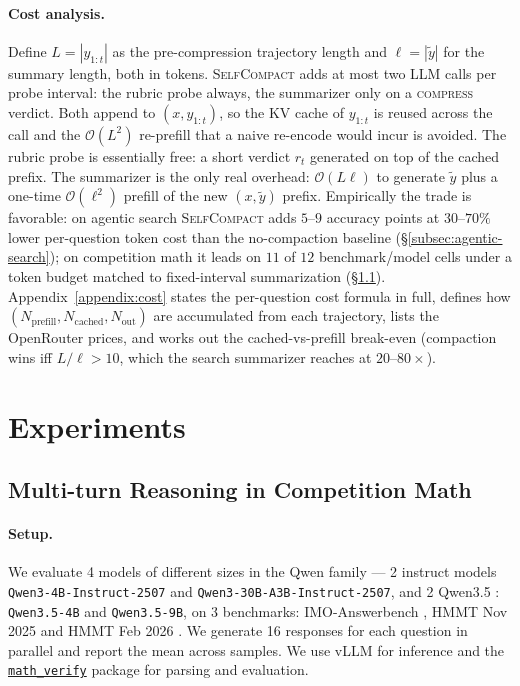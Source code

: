 \documentclass{article}
\newcommand{\jack}[1]{{\color{green}[JZ: #1]}}
\newcommand{\method}{\textsc{{SelfCompact}}}
\begin{document}
\paragraph{Cost analysis.} Define $L = |y_{1:t}|$ as the pre-compression
trajectory length and $\ell = |\tilde{y}|$ for the summary length, both in
tokens. \method{} adds at most two LLM calls per probe interval: the rubric
probe always, the summarizer only on a \textsc{compress} verdict. 
Both append to $(x, y_{1:t})$, so the KV cache of $y_{1:t}$ is reused
across the call and the $\mathcal{O}(L^2)$ re-prefill that a naive
re-encode would incur is avoided. The rubric probe is essentially free: a
short verdict $r_t$ generated on top of the cached prefix. The summarizer
is the only real overhead: $\mathcal{O}(L\ell)$ to generate $\tilde{y}$
plus a one-time $\mathcal{O}(\ell^2)$ prefill of the new $(x, \tilde{y})$
prefix. Empirically the trade is favorable: on agentic search
\method{} adds $5$--$9$ accuracy points at $30$--$70\%$ lower per-question
token cost than the no-compaction baseline (\S\ref{subsec:agentic-search});
on competition math it leads on $11$ of $12$ benchmark/model cells under a
token budget matched to fixed-interval summarization
(\S\ref{subsec:multi-turn-math}). Appendix~\ref{appendix:cost} states
the per-question cost formula in full, defines how
$(N_{\text{prefill}}, N_{\text{cached}}, N_{\text{out}})$ are
accumulated from each trajectory, lists the OpenRouter prices, and
works out the cached-vs-prefill break-even (compaction wins iff $L/\ell
> 10$, which the search summarizer reaches at $20$--$80\times$).

\section{Experiments}

\subsection{Multi-turn Reasoning in Competition Math}
\label{subsec:multi-turn-math}


\paragraph{Setup.} We evaluate 4 models of different sizes in the Qwen family --- 2 instruct models \texttt{Qwen3-4B-Instruct-2507} and \texttt{Qwen3-30B-A3B-Instruct-2507}, and 2 Qwen3.5 \citep{qwen3.5}: \texttt{Qwen3.5-4B} and \texttt{Qwen3.5-9B}, on 3 benchmarks: IMO-Answerbench \citep{luong-etal-2025-towards}, HMMT Nov 2025 and HMMT Feb 2026 \citep{balunovic2025matharena}. We generate 16 responses for each question in parallel and report the mean across samples. We use vLLM \citep{kwon2023efficient} for inference and the \href{https://github.com/huggingface/Math-Verify}{\texttt{math\_verify}} package for parsing and evaluation.
\end{document}
